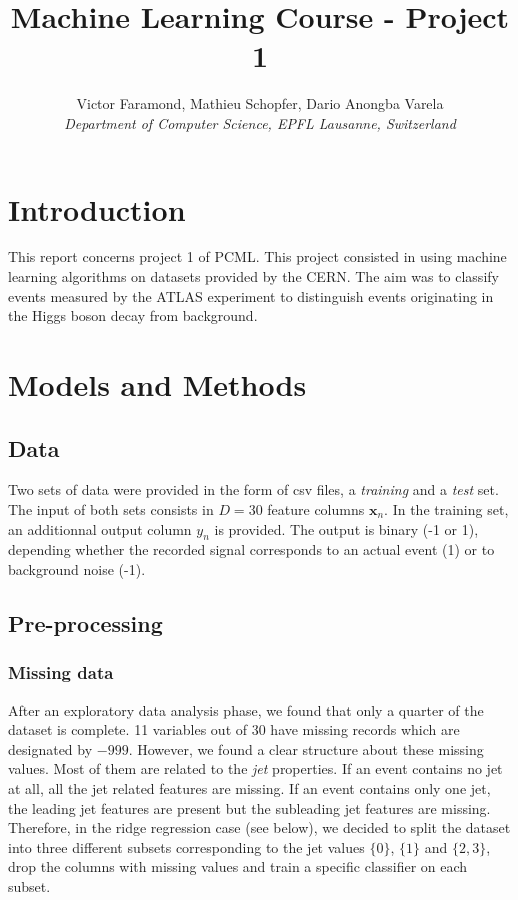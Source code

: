 \documentclass[10pt,conference,compsocconf]{IEEEtran}
\begin{document}
\title{Machine Learning Course - Project 1}

\author{
  Victor Faramond, Mathieu Schopfer, Dario Anongba Varela\\
  \textit{Department of Computer Science, EPFL Lausanne, Switzerland}
}

\maketitle

\section{Introduction}

This report concerns project 1 of PCML. This project consisted in using machine learning algorithms on datasets provided by the CERN. The aim was to classify events measured by the ATLAS experiment to distinguish events originating in the Higgs boson decay from background.

\section{Models and Methods}

\subsection{Data}

Two sets of data were provided in the form of csv files, a \textit{training} and a \textit{test} set. The input of both sets consists in $D=30$ feature columns $\mathbf{x}_n$. In the training set, an additionnal output column $y_n$ is provided. The output is binary (-1 or 1), depending whether the recorded signal corresponds to an actual event (1) or to background noise (-1).

\subsection{Pre-processing}
\subsubsection{Missing data} %
After an exploratory data analysis phase, we found that only a quarter of the dataset is complete. 11 variables out of 30 have missing records which are designated by $-999$. However, we found a clear structure about these missing values. Most of them are related to the \textit{jet} properties. If an event contains no jet at all, all the jet related features are missing. If an event contains only one jet, the leading jet features are present but the subleading jet features are missing. Therefore, in the ridge regression case (see below), we decided to split the dataset into three different subsets corresponding to the jet values $\{0\}$, $\{1\}$ and $\{2, 3\}$, drop the columns with missing values and train a specific classifier on each subset.
\end{document}
